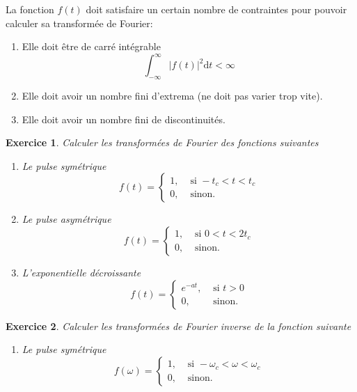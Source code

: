 \documentclass[a4paper,12pt]{book}
\newcommand{\dd}{\mathrm{d}}
\newtheorem*{exercice}{Exercice}
\begin{document}
La fonction $f(t)$ doit satisfaire un certain nombre de contraintes pour pouvoir calculer sa transformée
de Fourier:
\begin{enumerate}
 \item Elle doit être de carré intégrable
 \begin{equation}
  \int_{-\infty}^\infty |f(t)|^2\dd t < \infty
 \end{equation}
  \item Elle doit avoir un nombre fini d'extrema (ne doit pas varier trop vite).
  \item Elle doit avoir un nombre fini de discontinuités.
\end{enumerate}


\begin{exercice}
 Calculer les transformées de Fourier des fonctions suivantes
 \begin{enumerate}
  \item Le pulse symétrique
  \begin{equation}
   f(t)=\left\{\begin{array}{ll}
                1,&\mbox{ si }-t_c<t<t_c\\
                0,&\mbox{ sinon.}
               \end{array}\right.
  \end{equation}
  \item Le pulse asymétrique
  \begin{equation}
   f(t)=\left\{\begin{array}{ll}
                1,&\mbox{ si } 0<t<2t_c\\
                0,&\mbox{ sinon.}
               \end{array}\right.
  \end{equation}
  
  \item L'exponentielle décroissante
  \begin{equation}
   f(t)=\left\{\begin{array}{ll}
                e^{-at},&\mbox{ si } t>0\\
                0,&\mbox{ sinon.}
               \end{array}\right.
  \end{equation}


 \end{enumerate}
 \end{exercice}
 \begin{exercice}
 
 Calculer les transformées de Fourier inverse de la fonction suivante
 \begin{enumerate}
  \item Le pulse symétrique
  \begin{equation}
   f(\omega)=\left\{\begin{array}{ll}
                1,&\mbox{ si }-\omega_c<\omega<\omega_c\\
                0,&\mbox{ sinon.}
               \end{array}\right.
  \end{equation}
 \end{enumerate}

\end{exercice}
\end{document}
